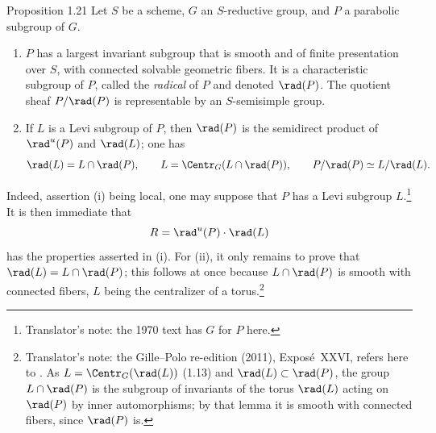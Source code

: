 \begin{sgastatement}{Proposition 1.21}
Let \(S\) be a scheme, \(G\) an \(S\)-reductive group, and \(P\) a
parabolic subgroup of \(G\).
\begin{enumerate}[label=\textup{(\roman*)}]
\item \(P\) has a largest invariant subgroup that is smooth and of finite
presentation over \(S\), with connected solvable geometric fibers.  It is
a characteristic subgroup of \(P\), called the \emph{radical} of \(P\)
and denoted \(\rad(P)\).  The quotient sheaf \(P/\rad(P)\) is representable
by an \(S\)-semisimple group.
\item If \(L\) is a Levi subgroup of \(P\), then \(\rad(P)\) is the
semidirect product of \(\rad^u(P)\) and \(\rad(L)\); one has
\[
 \rad(L)=L\cap\rad(P),
 \qquad
 L=\Centr_G(L\cap\rad(P)),
 \qquad
 P/\rad(P)\simeq L/\rad(L).
\]
\end{enumerate}
\end{sgastatement}

Indeed, assertion (i) being local, one may suppose that \(P\) has a Levi
subgroup \(L\).\footnote{Translator's note: the 1970 text has \(G\) for \(P\) here.}  It is then immediate that
\[
 R=\rad^u(P)\cdot\rad(L)
\]
has the properties asserted in (i).  For (ii), it only remains to prove
that \(\rad(L)=L\cap\rad(P)\); this follows at once because
\(L\cap\rad(P)\) is smooth with connected fibers, \(L\) being the
centralizer of a torus.\footnote{Translator's note: the Gille--Polo re-edition (2011), Exposé~XXVI, refers
here to . As \(L=\Centr_G(\rad(L))\) (1.13) and
\(\rad(L)\subset\rad(P)\), the group \(L\cap\rad(P)\) is the subgroup of
invariants of the torus \(\rad(L)\) acting on \(\rad(P)\) by inner
automorphisms; by that lemma it is smooth with connected fibers, since
\(\rad(P)\) is.}
